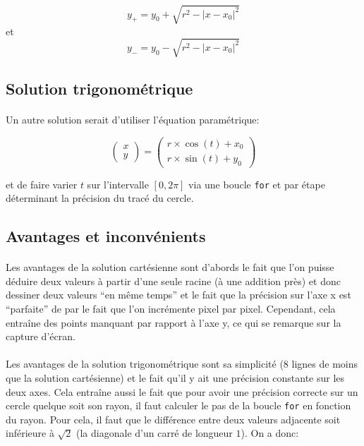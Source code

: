 \documentclass{report}
\begin{document}
\begin{equation}
	y_+ = y_0 + \sqrt{r^2 - {\left|x-x_0\right|}^2}
	\label{progcerclpos}
\end{equation}
et
\begin{equation}
	y_- = y_0 - \sqrt{r^2 - {\left|x-x_0\right|}^2}
	\label{progcerclneg}
\end{equation}

\subsection{Solution trigonométrique}

\paragraph{} Un autre solution serait d'utiliser l'équation paramétrique:

\begin{equation}
	\begin{pmatrix}
		x\\y
	\end{pmatrix}
	=
	\begin{pmatrix}
		r\times\cos(t) + x_0\\
		r\times\sin(t) + y_0
	\end{pmatrix}
	\label{param}
\end{equation}

et de faire varier $t$ sur l'intervalle $\left[0,2\pi\right]$ via une boucle
\lstinline[style=prog]|for| et par étape déterminant la précision du tracé du
cercle.

\subsection{Avantages et inconvénients}

\paragraph{} Les avantages de la solution cartésienne sont d'abords le fait que
l'on puisse déduire deux valeurs à partir d'une seule racine (à une addition
près) et donc dessiner deux valeurs ``en même temps'' et le fait que la
précision sur l'axe x est ``parfaite'' de par le fait que l'on incrémente pixel
par pixel. Cependant, cela entraîne des points manquant par rapport à l'axe y,
ce qui se remarque sur la capture d'écran.

\paragraph{} Les avantages de la solution trigonométrique sont sa simplicité (8
lignes de moins que la solution cartésienne) et le fait qu'il y ait une
précision constante sur les deux axes. Cela entraîne aussi le fait que pour
avoir une précision correcte sur un cercle quelque soit son rayon, il faut
calculer le pas de la boucle \lstinline[style=prog]|for| en fonction du rayon.
Pour cela, il faut que le différence entre deux valeurs adjacente soit
inférieure à $\sqrt{2}$ (la diagonale d'un carré de longueur $1$). On a donc:
\end{document}
